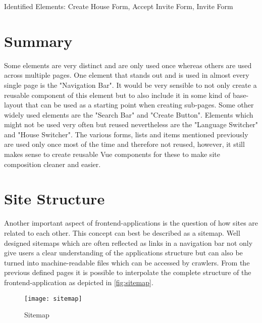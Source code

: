 Identified Elements: Create House Form, Accept Invite Form, Invite Form

\section{Summary}
Some elements are very distinct and are only used once whereas others are used across multiple pages. One element that stands out and is used in almost every single page is the "Navigation Bar". It would be very sensible to not only create a reusable component of this element but to also include it in some kind of base-layout that can be used as a starting point when creating sub-pages. Some other widely used elements are the "Search Bar" and "Create Button". Elements which might not be used very often but reused nevertheless are the "Language Switcher" and "House Switcher". The various forms, lists and items mentioned previously are used only once most of the time and therefore not reused, however, it still makes sense to create reusable Vue components for these to make site composition cleaner and easier.

\section{Site Structure}
Another important aspect of frontend-applications is the question of how sites are related to each other. This concept can best be described as a sitemap. Well designed sitemaps which are often reflected as links in a navigation bar not only give users a clear understanding of the applications structure but can also be turned into machine-readable files which can be accessed by crawlers. From the previous defined pages it is possible to interpolate the complete structure of the frontend-application as depicted in \autoref{fig:sitemap}. \newline

\begin{figure}[H]
    \begin{center}
    \texttt{[image: sitemap]}
    \end{center}
    \caption{Sitemap}
    \label{fig:sitemap}
\end{figure}